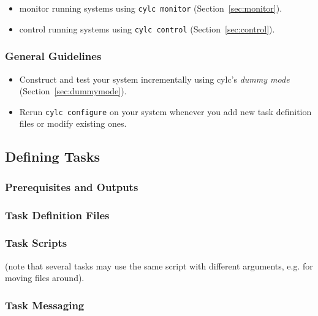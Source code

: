 \documentclass[11pt,a4paper]{article}
\begin{document}
\begin{itemize}
    \item monitor running systems using \verb=cylc monitor= (Section~\ref{sec:monitor}).

    \item control running systems using \verb=cylc control= (Section~\ref{sec:control}).
\end{itemize}


\subsubsection{General Guidelines}

\begin{itemize}

    \item Construct and test your system incrementally using cylc's {\em
        dummy mode} (Section~\ref{sec:dummymode}).

    \item Rerun \verb=cylc configure= on your system whenever you add
        new task definition files or modify existing ones.
\end{itemize}

\label{sec:tasktype}
\subsection{Defining Tasks}

\label{sec:requisites}
\subsubsection{Prerequisites and Outputs}

\label{sec:taskdef}
\subsubsection{Task Definition Files}

\subsubsection{Task Scripts}

(note that several tasks may use the same script with different
arguments, e.g. for moving files around).

\subsubsection{Task Messaging}
\end{document}
